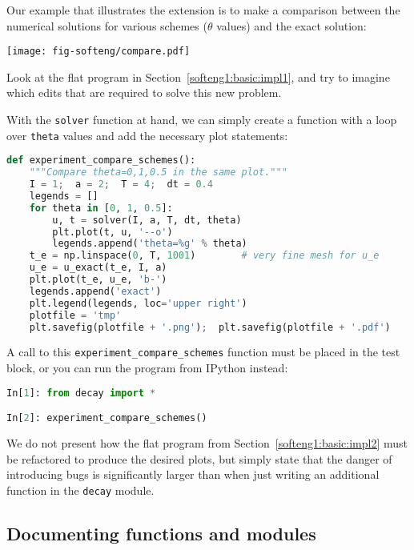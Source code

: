 \documentclass[graybox,sectrefs,envcountresetchap,open=right,final]{svmonodo}
\newenvironment{question_mdfboxadmon}[1][]{
\begin{question_mdfboxmdframed}[frametitle=#1]
}
{
\end{question_mdfboxmdframed}
}
\begin{document}
Our example that illustrates the extension
is to make a comparison between the numerical solutions
for various schemes ($\theta$ values) and the exact solution:



\centerline{\texttt{[image: fig-softeng/compare.pdf]}}




\begin{question_mdfboxadmon}
Look at the flat program in
Section~\ref{softeng1:basic:impl1},
and try to imagine which edits that are required to solve this new problem.
\end{question_mdfboxadmon}



With the \texttt{solver} function at hand, we can simply create a function
with a loop over \texttt{theta} values and add the necessary plot statements:

\begin{lstlisting}[language=Python,style=blue1_bluegreen]
def experiment_compare_schemes():
    """Compare theta=0,1,0.5 in the same plot."""
    I = 1;  a = 2;  T = 4;  dt = 0.4
    legends = []
    for theta in [0, 1, 0.5]:
        u, t = solver(I, a, T, dt, theta)
        plt.plot(t, u, '--o')
        legends.append('theta=%g' % theta)
    t_e = np.linspace(0, T, 1001)        # very fine mesh for u_e
    u_e = u_exact(t_e, I, a)
    plt.plot(t_e, u_e, 'b-')
    legends.append('exact')
    plt.legend(legends, loc='upper right')
    plotfile = 'tmp'
    plt.savefig(plotfile + '.png');  plt.savefig(plotfile + '.pdf')
\end{lstlisting}

A call to this \Verb!experiment_compare_schemes! function must be placed
in the test block, or you can run the program from IPython instead:

\begin{lstlisting}[language=Python,style=blue1_bluegreen]
In[1]: from decay import *

In[2]: experiment_compare_schemes()
\end{lstlisting}

We do not present how the flat program from
Section~\ref{softeng1:basic:impl2} must be refactored to produce the
desired plots, but simply state that the danger of introducing bugs
is significantly larger than when just writing an additional function
in the \texttt{decay} module.

\subsection{Documenting functions and modules}
\label{softeng1:basic:docstring}
\end{document}
